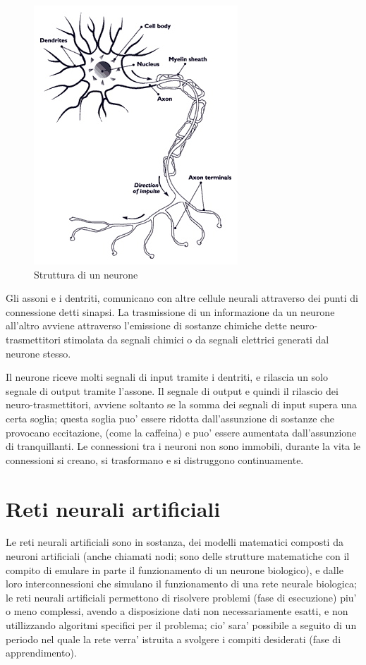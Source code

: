 \documentclass[a4paper,10pt]{report}
\begin{document}
\begin{figure}[h]
	\begin{center}	
		\includegraphics[scale=0.50]{img/neuron.jpg}
		\caption{Struttura di un neurone}
		\label{fig: Struttura di un neurone}
	\end{center}
\end{figure}
 
Gli assoni e i dentriti, comunicano con altre cellule neurali
attraverso dei punti di connessione detti sinapsi. La trasmissione
di un informazione da un neurone all'altro avviene attraverso
l'emissione  di sostanze chimiche dette neuro-trasmettitori 
stimolata da segnali chimici o da segnali elettrici 
generati dal neurone stesso.

Il neurone riceve molti segnali di input tramite i dentriti, 
e rilascia un solo segnale di output tramite l'assone. Il 
segnale di output e quindi il rilascio dei neuro-trasmettitori, avviene
soltanto se la somma dei segnali di input supera una certa soglia;
questa soglia puo' essere ridotta dall'assunzione di
sostanze che provocano eccitazione, (come la caffeina) e puo' essere
aumentata dall'assunzione di tranquillanti.
Le connessioni tra i neuroni non sono immobili, durante la vita le 
connessioni si creano, si trasformano e si distruggono continuamente.

\section{Reti neurali artificiali}
Le reti neurali artificiali sono in sostanza, dei modelli matematici composti
da neuroni artificiali (anche chiamati nodi; sono delle strutture matematiche 
con il compito di emulare in parte il funzionamento di un neurone biologico), 
e dalle loro  interconnessioni che simulano il funzionamento di una rete neurale 
biologica;
le reti neurali artificiali permettono di risolvere problemi (fase di esecuzione)
piu' o meno complessi,
avendo a disposizione dati
non necessariamente esatti, e non utillizzando algoritmi specifici per il problema;
cio' sara' possibile a seguito di un periodo nel quale la rete verra'
istruita a svolgere i compiti desiderati (fase di apprendimento).
\end{document}
